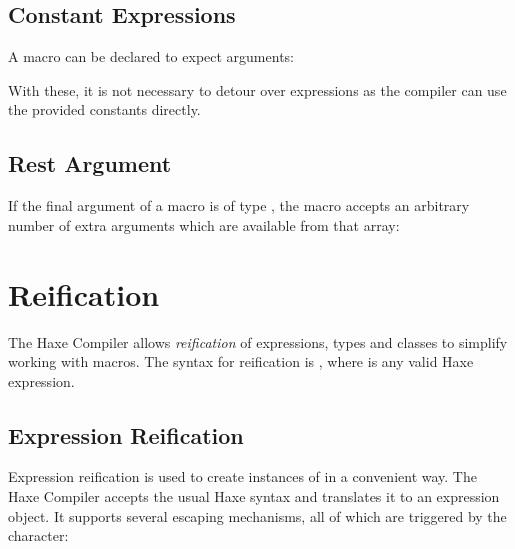 \subsection{Constant Expressions}
\label{macro-constant-arguments}

A macro can be declared to expect  arguments:


With these, it is not necessary to detour over expressions as the compiler can use the provided constants directly.

\subsection{Rest Argument}
\label{macro-rest-argument}

If the final argument of a macro is of type , the macro accepts an arbitrary number of extra arguments which are available from that array:





\section{Reification}
\label{macro-reification}

The Haxe Compiler allows \emph{reification} of expressions, types and classes to simplify working with macros. The syntax for reification is , where  is any valid Haxe expression.

\subsection{Expression Reification}
\label{macro-reification-expression}

Expression reification is used to create instances of  in a convenient way. The Haxe Compiler accepts the usual Haxe syntax and translates it to an expression object. It supports several escaping mechanisms, all of which are triggered by the \expr{\$} character:

